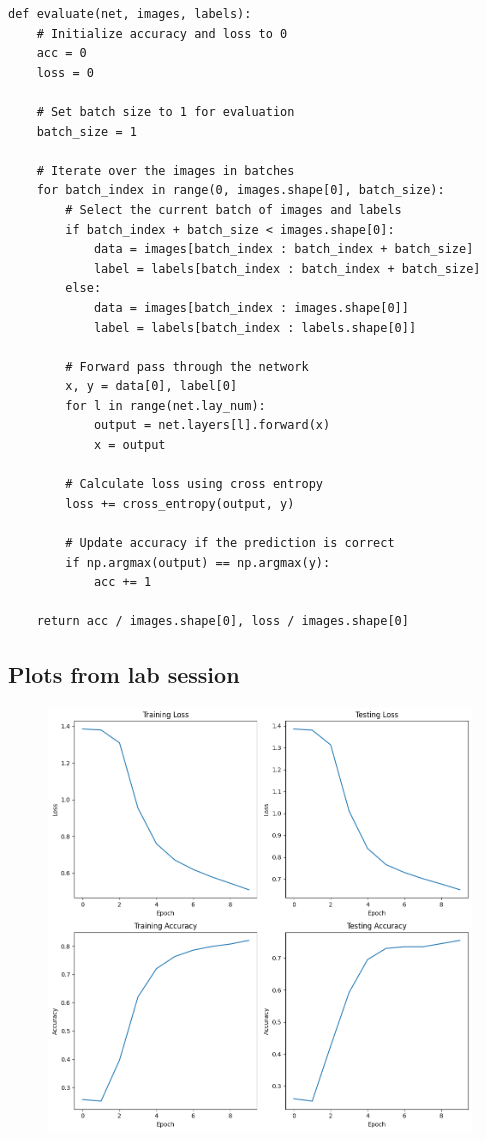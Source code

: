 \documentclass[twocolumn]{article}
\begin{document}
\begin{verbatim}
def evaluate(net, images, labels):
    # Initialize accuracy and loss to 0
    acc = 0
    loss = 0

    # Set batch size to 1 for evaluation
    batch_size = 1

    # Iterate over the images in batches
    for batch_index in range(0, images.shape[0], batch_size):
        # Select the current batch of images and labels
        if batch_index + batch_size < images.shape[0]:
            data = images[batch_index : batch_index + batch_size]
            label = labels[batch_index : batch_index + batch_size]
        else:
            data = images[batch_index : images.shape[0]]
            label = labels[batch_index : labels.shape[0]]

        # Forward pass through the network
        x, y = data[0], label[0]
        for l in range(net.lay_num):
            output = net.layers[l].forward(x)
            x = output

        # Calculate loss using cross entropy
        loss += cross_entropy(output, y)

        # Update accuracy if the prediction is correct
        if np.argmax(output) == np.argmax(y):
            acc += 1

    return acc / images.shape[0], loss / images.shape[0]
\end{verbatim}

\newpage
\subsection*{Plots from lab session}

\begin{figure}[h]
    \centering
    \includegraphics[width=1\textwidth]{lab-plots.png}
\end{figure}
\end{document}
